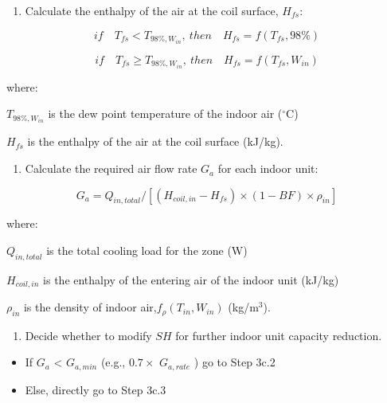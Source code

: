\begin{enumerate}
\def\labelenumi{\arabic{enumi})}
\setcounter{enumi}{1}
\tightlist
\item
  Calculate the enthalpy of the air at the coil surface, \(H_{fs}\):
\end{enumerate}

\begin{equation}
if\quad{T_{fs}}<T_{98\%,W_{in}}{, ~then}\quad{H_{fs}} = f(T_{fs},98\%)
\end{equation}

\begin{equation}
if\quad{T_{fs}}\ge{T_{98\%,W_{in}}}{,~then}\quad{H_{fs}} = f(T_{fs},W_{in})
\end{equation}

where:

\(T_{98\%,W_{in}}\) is the dew point temperature of the indoor air (\(^{\circ}\)C)

\(H_{fs}\) is the enthalpy of the air at the coil surface (kJ/kg).

\begin{enumerate}
\def\labelenumi{\arabic{enumi})}
\setcounter{enumi}{2}
\tightlist
\item
  Calculate the required air flow rate \(G_a\) for each indoor unit:
\end{enumerate}

\begin{equation}
G_a = Q_{in,total}/[(H_{coil,in}-H_{fs})\times{(1-BF)}\times{\rho_{in}}]
\end{equation}

where:

\(Q_{in,total}\) is the total cooling load for the zone (W)

\(H_{coil,in}\) is the enthalpy of the entering air of the indoor unit (kJ/kg)

\(\rho_{in}\) is the density of indoor air,\(f_{\rho}(T_{in},W_{in})\) (kg/m\(^{3}\)).

\begin{enumerate}
\def\labelenumi{\arabic{enumi})}
\setcounter{enumi}{3}
\tightlist
\item
  Decide whether to modify \(SH\) for further indoor unit capacity reduction.
\end{enumerate}

\begin{itemize}
\item
  If \(G_a\) \textless{} \(G_{a,min}\) (e.g., \(0.7\times\) \(G_{a,rate}\) ) go to Step 3c.2
\item
  Else, directly go to Step 3c.3
\end{itemize}

